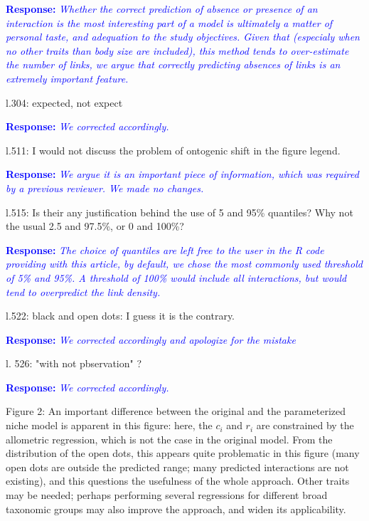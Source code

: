\documentclass [12pt,onecolumn,twoside,openright]{report}
\begin{document}
\begin{onehalfspacing}
\textcolor{blue}{\textbf{Response:}} \textit{\textcolor{blue}{Whether the
correct prediction of absence or presence of an interaction is the most
interesting part of a model is ultimately a matter of personal taste, and
adequation to the study objectives. Given that (especialy when no other traits
than body size are included), this method tends to over-estimate the number of
links, we argue that correctly predicting absences of links is an extremely
important feature.}}

\medskip l.304: expected, not expect

\textcolor{blue}{\textbf{Response:}} \textit{\textcolor{blue}{We corrected
accordingly.}}

\medskip l.511: I would not discuss the problem of ontogenic
shift in the figure legend.

\textcolor{blue}{\textbf{Response:}} \textit{\textcolor{blue}{We argue it is an
important piece of information, which was required by a previous reviewer. We
made no changes.}}

\medskip l.515: Is their any justification behind the use of 5
and 95\% quantiles? Why not the usual 2.5 and 97.5\%, or 0 and 100\%?

\textcolor{blue}{\textbf{Response:}} \textit{\textcolor{blue}{The choice of quantiles are left free to the user in the R code providing with this article, by default, we chose the most commonly used threshold of 5\% and 95\%. A threshold of 100\% would include all interactions, but would tend to overpredict the link density.}}

\medskip l.522: black and open dots: I guess it is the
contrary.

\textcolor{blue}{\textbf{Response:}} \textit{\textcolor{blue}{We corrected accordingly and apologize for the mistake}}

\medskip l. 526: "with not pbservation" ?

\textcolor{blue}{\textbf{Response:}} \textit{\textcolor{blue}{We corrected
accordingly.}}

\medskip Figure 2: An important difference between the original and the
parameterized niche model is apparent in this figure: here, the $c_i$ and $r_i$
are constrained by the allometric regression, which is not the case in the
original model. From the distribution of the open dots, this appears quite
problematic in this figure (many open dots are outside the predicted range; many
predicted interactions are not existing), and this questions the usefulness of
the whole approach. Other traits may be needed; perhaps performing several
regressions for different broad taxonomic groups may also improve the approach,
and widen its applicability.


\end{onehalfspacing}
\end{document}
